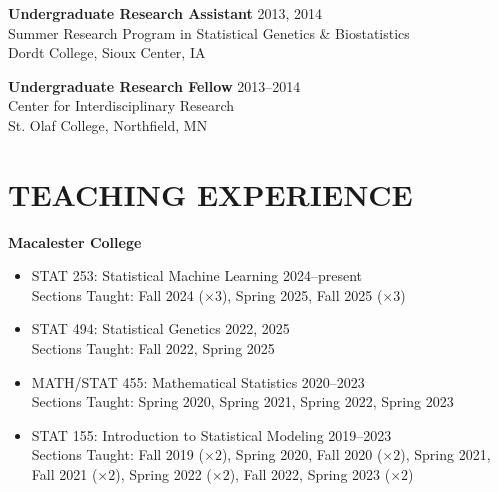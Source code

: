 \documentclass[margin]{res}
\begin{document}
\begin{resume}

\textbf{Undergraduate Research Assistant} \hfill 2013, 2014 \\
Summer Research Program in Statistical Genetics \& Biostatistics \\
Dordt College, Sioux Center, IA

\textbf{Undergraduate Research Fellow} \hfill 2013--2014 \\
Center for Interdisciplinary Research \\
St. Olaf College, Northfield, MN \\


\section{TEACHING EXPERIENCE}

\textbf{Macalester College}
\begin{itemize} 
\item STAT 253: Statistical Machine Learning \hfill 2024--present \\
Sections Taught: Fall 2024 ($\times 3$), Spring 2025, Fall 2025 ($\times 3$)%
\item STAT 494: Statistical Genetics \hfill 2022, 2025 \\
Sections Taught: Fall 2022, Spring 2025
\item MATH/STAT 455: Mathematical Statistics  \hfill 2020--2023 \\ 
Sections Taught: Spring 2020, Spring 2021, Spring 2022, Spring 2023
\item STAT 155: Introduction to Statistical Modeling  \hfill 2019--2023 \\
Sections Taught: Fall 2019 ($\times 2$), Spring 2020, Fall 2020 ($\times 2$), Spring 2021,\\ 
Fall 2021 ($\times 2$), Spring 2022 ($\times 2$), Fall 2022, Spring 2023 ($\times 2$)
\end{itemize}


\end{resume}
\end{document}
